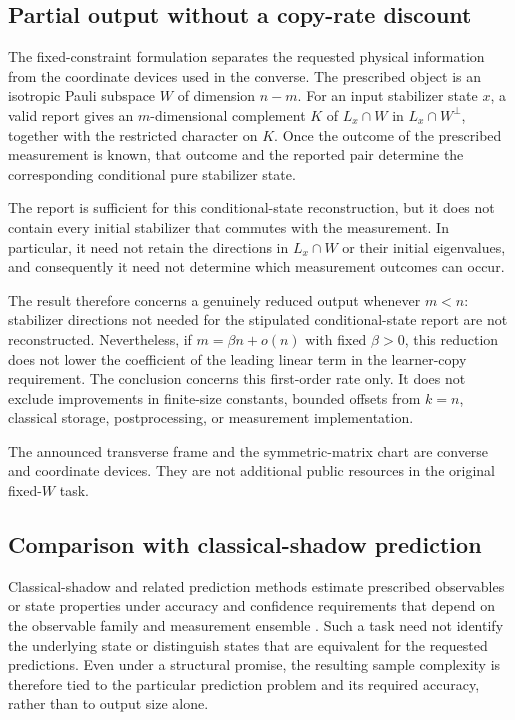 \documentclass[11pt]{article}
\newcommand{\1}{\mathbf 1}
\theoremstyle{plain}
\theoremstyle{definition}
\theoremstyle{remark}
\begin{document}
\subsection{Partial output without a copy-rate discount}  
The fixed-constraint formulation separates the requested physical information  
from the coordinate devices used in the converse.  The prescribed object is an  
isotropic Pauli subspace $W$ of dimension $n-m$.  For an input stabilizer state  
$x$, a valid report gives an $m$-dimensional complement $K$ of  
$L_x\cap W$ in $L_x\cap W^\perp$, together with the restricted character on  
$K$.  Once the outcome of the prescribed measurement is known, that outcome  
and the reported pair determine the corresponding conditional pure stabilizer  
state.  

The report is sufficient for this conditional-state reconstruction, but it  
does not contain every initial stabilizer that commutes with the measurement.  
In particular, it need not retain the directions in $L_x\cap W$ or their  
initial eigenvalues, and consequently it need not determine which measurement  
outcomes can occur.  

The result therefore concerns a genuinely reduced output whenever $m<n$:  
stabilizer directions not needed for the stipulated conditional-state report  
are not reconstructed.  Nevertheless, if $m=\beta n+o(n)$ with fixed  
$\beta>0$, this reduction does not lower the coefficient of the leading linear  
term in the learner-copy requirement.  The conclusion concerns this  
first-order rate only.  It does not exclude improvements in finite-size  
constants, bounded offsets from $k=n$, classical storage, postprocessing, or  
measurement implementation.  

The announced transverse frame and the symmetric-matrix chart are converse  
and coordinate devices.  They are not additional public resources in the  
original fixed-$W$ task.  

\subsection{Comparison with classical-shadow prediction}  
Classical-shadow and related prediction methods estimate prescribed  
observables or state properties under accuracy and confidence requirements  
that depend on the observable family and measurement ensemble  
\cite{HuangKuengPreskill2020ClassicalShadows,  
ChenYuZengFlammia2021RobustShadows,  
HadfieldEtAl2022LocallyBiasedShadows,  
BertoniEtAl2024ShallowShadows}.  Such a task need not identify the underlying  
state or distinguish states that are equivalent for the requested predictions.  
Even under a structural promise, the resulting sample complexity is therefore  
tied to the particular prediction problem and its required accuracy, rather  
than to output size alone.  
\end{document}
